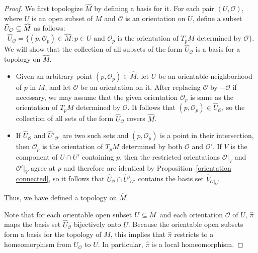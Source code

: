 \begin{proof}
We first topologize $\widehat{M}$ by defining a basis for it. For each pair $(U,\mathcal{O})$, where $U$ is an open subset of $M$ and $\mathcal{O}$ is an orientation on $U$, define a subset $\widehat{U}_\mathcal{O}\subseteq\widehat{M}$ as follows:
\[\widehat{U}_\mathcal{O}=\{(p,\mathcal{O}_p)\in\widehat{M}:\text{$p\in U$ and $\mathcal{O}_p$ is the orientation of $T_pM$ determined by $\mathcal{O}$}\}.\]
We will show that the collection of all subsets of the form $\widehat{U}_\mathcal{O}$ is a basis for a topology on $\widehat{M}$.
\begin{itemize}
\item Given an arbitrary point $(p,\mathcal{O}_p)\in\widehat{M}$, let $U$ be an orientable neighborhood of $p$ in $M$, and let $\mathcal{O}$ be an orientation on it. After replacing $\mathcal{O}$ by $-\mathcal{O}$ if necessary, we may assume that the given orientation $\mathcal{O}_p$ is same as the orientation of $T_pM$ determined by $\mathcal{O}$. It follows that $(p,\mathcal{O}_p)\in\widehat{U}_\mathcal{O}$, so the collection of all sets of the form $\widehat{U}_\mathcal{O}$ covers $\widehat{M}$.
\item If $\widehat{U}_\mathcal{O}$ and $\widehat{U}'_{\mathcal{O}'}$ are two such sets and $(p,\mathcal{O}_p)$ is a point in their intersection, then $\mathcal{O}_p$ is the orientation of $T_pM$ determined by both $\mathcal{O}$ and $\mathcal{O}'$. If $V$ is the component of $U\cap U'$ containing $p$, then the restricted orientations $\mathcal{O}|_V$ and $\mathcal{O}'|_V$ agree at $p$ and therefore are identical by Proposition~\ref{orientation connected}, so it follows that $\widehat{U}_\mathcal{O}\cap\widehat{U}'_{\mathcal{O}'}$ contains the basis set $\widehat{V}_{\mathcal{O}|_V}$.
\end{itemize}
Thus, we have defined a topology on $\widehat{M}$.\par
Note that for each orientable open subset $U\subseteq M$ and each orientation $\mathcal{O}$ of $U$, $\widehat{\pi}$ maps the basis set $\widehat{U}_{\mathcal{O}}$ bijectively onto $U$. Because the orientable open subsets form a basis for the topology of $M$, this implies that $\widehat{\pi}$ restricts to a homeomorphism from $\widehat{U}_\mathcal{O}$ to $U$. In particular, $\widehat{\pi}$ is a local homeomorphism.\par

\end{proof}
